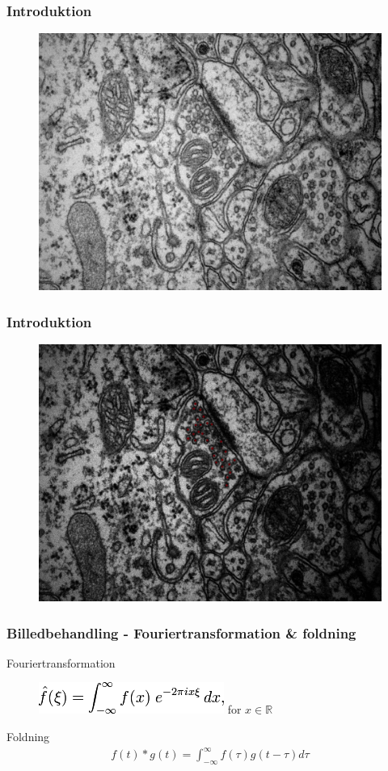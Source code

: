 \documentclass[12pt,t]{beamer}
\begin{document}
\begin{frame}
\frametitle{Introduktion}
\begin{figure}[H]
\includegraphics[scale=0.4]{img/orig/AN2-3_7.jpg}
\end{figure}
\end{frame}

\begin{frame}
\frametitle{Introduktion}
\begin{figure}[H]
\includegraphics[scale=0.4]{img/orig/AN2-3_7_new.jpg}
\end{figure}
\end{frame}

\begin{frame}
\frametitle{Billedbehandling - Fouriertransformation \& foldning}
Fouriertransformation
\begin{figure}[H]
\includegraphics[scale=0.35]{img/billedbeh/fourier.png}
\hspace{0.1cm}  for $x \in \mathbb{R}$
\end{figure}
Foldning
\begin{align*}
	f(t)*g(t)=\int_{-\infty}^{\infty}f(\tau)g(t-\tau)d\tau
\end{align*}
\end{frame}
\end{document}
